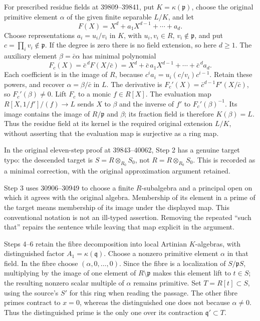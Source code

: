 For prescribed residue fields at 39809--39841, put \(K=\kappa(\mathfrak p)\), choose the original primitive element \(\alpha\) of the given finite separable \(L/K\), and let \[
F(X)=X^d+a_1X^{d-1}+\cdots+a_d.
\] Choose representations \(a_i=u_i/v_i\) in \(K\), with \(u_i,v_i\in R\), \(v_i\notin\mathfrak p\), and put \(c=\prod_i v_i\notin\mathfrak p\). If the degree is zero there is no field extension, so here \(d\ge1\). The auxiliary element \(\beta=\bar c\alpha\) has minimal polynomial \[
F_c(X)=\bar c^{\,d}F(X/\bar c)
=X^d+\bar c\,a_1X^{d-1}+\cdots+\bar c^{\,d}a_d.
\] Each coefficient is in the image of \(R\), because \(c^i a_i=u_i(c/v_i)c^{i-1}\). Retain these powers, and recover \(\alpha=\beta/\bar c\) in \(L\). The derivative is \(F_c'(X)=\bar c^{d-1}F'(X/\bar c)\), so \(F_c'(\beta)\ne0\). Lift \(F_c\) to a monic \(f\in R[X]\). The evaluation map \(R[X,1/f']/(f)\to L\) sends \(X\) to \(\beta\) and the inverse of \(f'\) to \(F_c'(\beta)^{-1}\). Its image contains the image of \(R/\mathfrak p\) and \(\beta\); its fraction field is therefore \(K(\beta)=L\). Thus the residue field at its kernel is the required original extension \(L/K\), without asserting that the evaluation map is surjective as a ring map.

In the original eleven-step proof at 39843--40062, Step 2 has a genuine target typo: the descended target is \(S=R\otimes_{R_0}S_0\), not \(R=R\otimes_{R_0}S_0\). This is recorded as a minimal correction, with the original approximation argument retained.

Step 3 uses 30906--30949 to choose a finite \(R\)-subalgebra and a principal open on which it agrees with the original algebra. Membership of its element in a prime of the target means membership of its image under the displayed map. This conventional notation is not an ill-typed assertion. Removing the repeated ``such that'' repairs the sentence while leaving that map explicit in the argument.

Steps 4--6 retain the fibre decomposition into local Artinian \(K\)-algebras, with distinguished factor \(A_1=\kappa(\mathfrak q)\). Choose a nonzero primitive element \(\alpha\) in that field. In the fibre choose \((\alpha,0,\ldots,0)\). Since the fibre is a localization of \(S/\mathfrak pS\), multiplying by the image of one element of \(R\setminus\mathfrak p\) makes this element lift to \(t\in S\); the resulting nonzero scalar multiple of \(\alpha\) remains primitive. Set \(T=R[t]\subset S\), using the source's \(S'\) for this ring when reading the passage. The other fibre primes contract to \(x=0\), whereas the distinguished one does not because \(\alpha\ne0\). Thus the distinguished prime is the only one over its contraction \(\mathfrak q'\subset T\).


